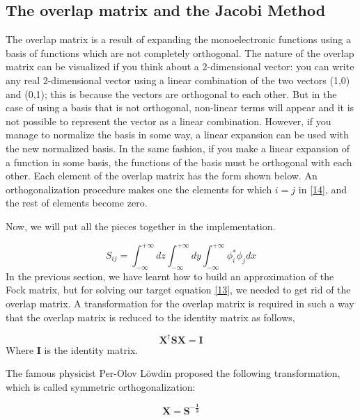 \documentclass{tmr}
\newcommand{\inftyint}{\int_{-\infty}^{+\infty}}
\begin{document}
\subsection{The overlap matrix and the Jacobi Method}

The overlap matrix is a result of expanding the monoelectronic
functions using a basis of functions which are not completely orthogonal. The nature 
of the overlap matrix can be visualized if you think about a 2-dimensional vector:
you can write any real 2-dimensional vector using a linear combination of the two
vectors (1,0) and (0,1); this is because the vectors are orthogonal to each other. But in the case 
of using a basis that is not orthogonal, non-linear terms will appear and 
it is not possible to represent the vector as a linear combination.
However, if you manage to normalize the basis in some way, a linear expansion can
be used with the new normalized basis. In the same fashion, if you make a linear expansion 
of a function in some basis, the functions of the basis must be orthogonal
with each other. Each element of the overlap matrix has the form shown below.
An orthogonalization procedure makes one the elements for which $i=j$ in \eqref{14}, and
the rest of elements become zero.

Now, we will put all the pieces together in the implementation.


\begin{equation}\label{16}
S_{ij} = \inftyint {dz \inftyint {dy \inftyint {\phi^{*}_{i} \phi_{j}dx}}} 
\end{equation}
In the previous section, we have learnt how to build an approximation of the Fock matrix,
but for solving our target equation \eqref{13}, we needed to get rid of the overlap matrix.
A transformation for the overlap matrix is required in such a way that the overlap matrix
is reduced to the identity matrix as follows,

\begin{equation}\label{17}
 \mathbf{X^{\dagger}SX} = \mathbf{I}
\end{equation}
Where \textbf{I} is the identity matrix. 

\par The famous physicist Per-Olov L\"owdin proposed the following transformation,
which is called symmetric orthogonalization:

\begin{equation}\label{18}
\mathbf{X} = \mathbf{S^{-\frac{1}{2}}} 
\end{equation}
\end{document}
